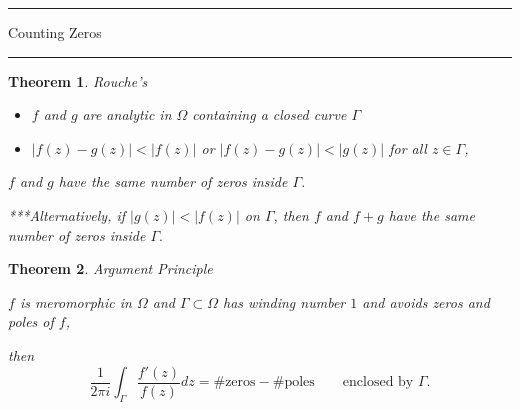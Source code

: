 \documentclass[12pt]{Qual}
\newtheorem{theorem}{Theorem}
\begin{document}
\begin{center}
\noindent\textcolor{blue!60!black}{\rule{15cm}{1mm}}
\Huge \faBug\faPuzzlePiece\faCoffee Counting Zeros \faCoffee\faPuzzlePiece\faBug
\vspace{-0.5cm}
\noindent\textcolor{blue!60!black}{\rule{15cm}{1mm}}
\end{center}
\vspace{0.5cm}
\begin{theorem}{\Large\textit{Rouche's}}

\vspace{-0.25cm}
\begin{itemize}[leftmargin=2.5cm]
\setlength\itemsep{-0.1em}
\renewcommand\labelitemi{\faPuzzlePiece}
    \item $f$ and $g$ are analytic in $\Omega$ containing a closed curve $\Gamma$
    \item $|f(z)-g(z)|<|f(z)|$ or $|f(z)-g(z)|<|g(z)|$ for all $z\in\Gamma$,
\end{itemize}

 $f$ and $g$ have the same number of zeros inside $\Gamma$.

\begin{mybox}
***Alternatively, if $|g(z)|<|f(z)|$ on $\Gamma$, then $f$ and $f+g$ have the same number of zeros inside $\Gamma.$
\end{mybox}
\end{theorem}
\vspace{-0.5cm}
\begin{theorem}{\Large\textit{Argument Principle}}

 \begin{minipage}{0.85\textwidth}
\vspace{0.45cm}
$f$ is meromorphic in $\Omega$ and $\Gamma\subset\Omega$ has winding number $1$ and avoids zeros and poles of $f$,
\end{minipage}

then $$\frac{1}{2\pi i}\int_\Gamma\frac{f'(z)}{f(z)}dz=\#\text{zeros}-\#\text{poles}\qquad\text{enclosed by }\Gamma.$$

\end{theorem}
\end{document}
